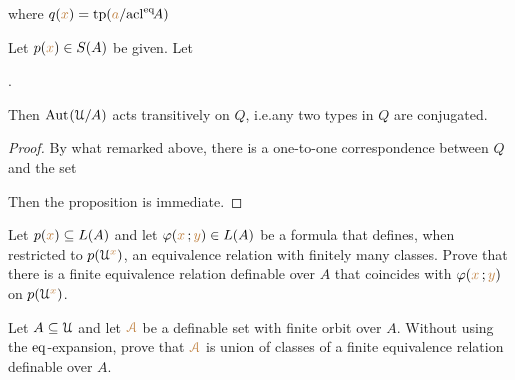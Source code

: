 \hfill where  $q({\color{brown} x})={\rm tp}({\color{brown} a}/{\rm acl}^{{\rm eq}}\!A)$



\begin{proposition}\label{prop_trans_action}
  Let $p({\color{brown} x})\in S(A)$ be given.
  Let 
  
  .
  
  Then ${\rm Aut\kern.15ex}(\EuScript U/A)$ acts transitively on $Q$, i.e.\@ any two types in $Q$ are conjugated.
\end{proposition}

\begin{proof}
  By what remarked above, there is a one-to-one correspondence between $Q$ and the set


  Then the proposition is immediate.
\end{proof}


\begin{exercise}
Let $p({\color{brown} x})\subseteq L(A)$ and let $\varphi({\color{brown} x}\,;{\color{brown} y})\in L(A)$ be a formula that defines, when restricted to $p(\EuScript U^{\color{brown} x})$, an equivalence relation with finitely many classes.
Prove that there is a finite equivalence relation definable over $A$ that coincides with $\varphi({\color{brown} x}\,;{\color{brown} y})$ on $p(\EuScript U^{\color{brown} x})$.
\end{exercise}

\begin{exercise}\label{ex_feqthm_senza_eq}
Let $A\subseteq\EuScript U$ and let ${\color{brown}\EuScript A}$ be a definable set with finite orbit over $A$.
Without using the ${{\rm eq}}$-expansion, prove that ${\color{brown}\EuScript A}$ is union of classes of a finite equivalence relation definable over $A$.
\end{exercise}

